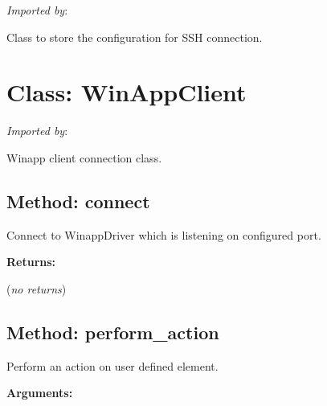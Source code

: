\emph{Imported by}:

\begin{Shaded}
\begin{Highlighting}[]
\end{Highlighting}
\end{Shaded}

Class to store the configuration for SSH connection.

\hypertarget{qconnectwinapp-winappdriver-winapp-client-winappclient}{%
\section{Class: WinAppClient}\label{qconnectwinapp-winappdriver-winapp-client-winappclient}}

\emph{Imported by}:

\begin{Shaded}
\begin{Highlighting}[]
\end{Highlighting}
\end{Shaded}

Winapp client connection class.

\hypertarget{qconnectwinapp-winappdriver-winapp-client-winappclient-connect}{%
\subsection{Method: connect}\label{qconnectwinapp-winappdriver-winapp-client-winappclient-connect}}

Connect to WinappDriver which is listening on configured port.

\textbf{Returns:}

(\emph{no returns})

\hypertarget{qconnectwinapp-winappdriver-winapp-client-winappclient-perform-action}{%
\subsection{Method: perform\_action}\label{qconnectwinapp-winappdriver-winapp-client-winappclient-perform-action}}

Perform an action on user defined element.

\textbf{Arguments:}

